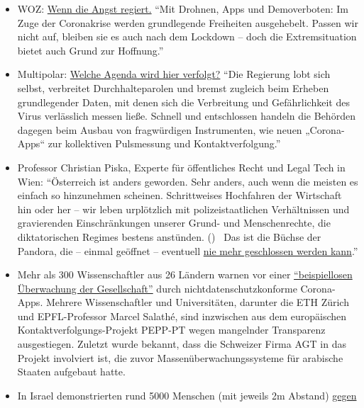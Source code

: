 \begin{itemize}
\tightlist
\item
  WOZ:
  \href{https://www.woz.ch/2016/grundrechte/wenn-die-angst-regiert}{Wenn
  die Angst regiert.} ``Mit Drohnen, Apps und Demoverboten: Im Zuge der
  Coronakrise werden grundlegende Freiheiten ausgehebelt. Passen wir
  nicht auf, bleiben sie es auch nach dem Lockdown -- doch die
  Extremsituation bietet auch Grund zur Hoffnung.''
\item
  Multipolar:
  \href{https://multipolar-magazin.de/artikel/die-massnahmen-wirken}{Welche
  Agenda wird hier verfolgt?} ``Die Regierung lobt sich selbst,
  verbreitet Durchhalteparolen und bremst zugleich beim Erheben
  grundlegender Daten, mit denen sich die Verbreitung und Gefährlichkeit
  des Virus verlässlich messen ließe. Schnell und entschlossen handeln
  die Behörden dagegen beim Ausbau von fragwürdigen Instrumenten, wie
  neuen „Corona-Apps`` zur kollektiven Pulsmessung und
  Kontaktverfolgung.''
\item
  Professor Christian Piska, Experte für öffentliches Recht und Legal
  Tech in Wien: ``Österreich ist anders geworden. Sehr anders, auch wenn
  die meisten es einfach so hinzunehmen scheinen. Schrittweises
  Hochfahren der Wirtschaft hin oder her -- wir leben urplötzlich mit
  polizeistaatlichen Verhältnissen und gravierenden Einschränkungen
  unserer Grund- und Menschenrechte, die diktatorischen Regimes bestens
  anstünden. ()~ Das ist die Büchse der Pandora, die -- einmal geöffnet
  -- eventuell
  \href{https://kurier.at/meinung/das-juristische-totschlagargument-vom-menschenleben/400814570}{nie
  mehr geschlossen werden kann}.''
\item
  Mehr als 300 Wissenschaftler aus 26 Ländern warnen vor einer
  \href{https://www.golem.de/news/corona-app-300-wissenschaftler-warnen-vor-zentraler-datenspeicherung-2004-147973.html}{``beispiellosen
  Überwachung der Gesellschaft''} durch nichtdatenschutzkonforme
  Corona-Apps. Mehrere Wissenschaftler und Universitäten, darunter die
  ETH Zürich und EPFL-Professor Marcel Salathé, sind inzwischen aus dem
  europäischen Kontaktverfolgungs-Projekt PEPP-PT wegen mangelnder
  Transparenz ausgestiegen. Zuletzt wurde bekannt, dass die Schweizer
  Firma AGT in das Projekt involviert ist, die zuvor
  Massen­über­wachungs­systeme für arabische Staaten aufgebaut hatte.
\item
  In Israel demonstrierten rund 5000 Menschen (mit jeweils 2m Abstand)
  \href{https://edition.cnn.com/2020/04/20/middleeast/israel-protest-social-distancing-intl/index.html}{gegen
}
\end{itemize}
